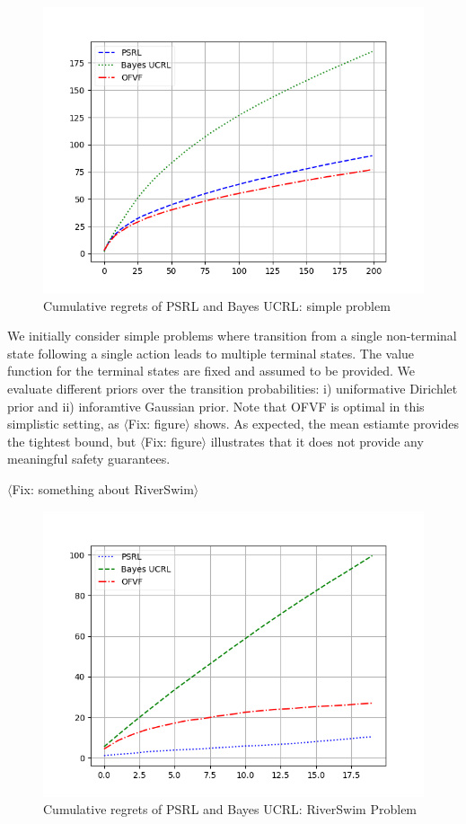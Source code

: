\documentclass{article}
\newcommand{\fix}[1]{{$\langle${\color{red}\sc Fix: #1}$\rangle$}}
\begin{document}
\begin{figure}[h!]
	\centering
	\includegraphics[width=\linewidth]{figures/SimpleProblem_PSRL_BayesUCRL_OFVF.png}
	\caption{Cumulative regrets of PSRL and Bayes UCRL:  simple problem}
	\label{fig:dirichlet_result_simple}
\end{figure}

We initially consider simple problems where transition from a single
non-terminal state following a single action leads to multiple
terminal states. The value function for the terminal states are fixed
and assumed to be provided. We evaluate different priors over the
transition probabilities: i) uniformative Dirichlet prior and ii)
inforamtive Gaussian prior. Note that OFVF is optimal in this
simplistic setting, as \fix{figure} shows. As expected, the mean
estiamte provides the tightest bound, but \fix{figure} illustrates
that it does not provide any meaningful safety guarantees.

\fix{something about RiverSwim}

\begin{figure}[h!]
	\centering
		\includegraphics[width=\linewidth]{figures/RiverSwim_RSVF_BAYESUCB_PSRL.png}
	\caption{Cumulative regrets of PSRL and Bayes UCRL: RiverSwim Problem }
	\label{fig:dirichlet_result_RiverSwim}
\end{figure}
\end{document}
